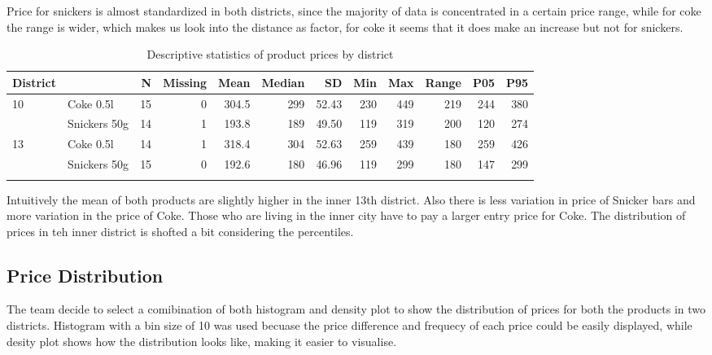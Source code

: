 \documentclass[
  9pt,
]{article}
\begin{document}
Price for snickers is almost standardized in both districts, since the
majority of data is concentrated in a certain price range, while for
coke the range is wider, which makes us look into the distance as
factor, for coke it seems that it does make an increase but not for
snickers.

\begin{table}[!h]

\caption{\label{tab:unnamed-chunk-3}Descriptive statistics of product prices by district}
\centering
\fontsize{8}{10}\selectfont
\begin{tabular}[t]{llrrrrrrrrrr}
\toprule
District &   & N & Missing & Mean & Median & SD & Min & Max & Range & P05 & P95\\
\midrule
10 & Coke 0.5l & 15 & \num{0} & \num{304.5} & \num{299} & \num{52.43} & 230 & 449 & \num{219} & \num{244} & \num{380}\\
 & Snickers 50g & 14 & \num{1} & \num{193.8} & \num{189} & \num{49.50} & 119 & 319 & \num{200} & \num{120} & \num{274}\\
13 & Coke 0.5l & 14 & \num{1} & \num{318.4} & \num{304} & \num{52.63} & 259 & 439 & \num{180} & \num{259} & \num{426}\\
 & Snickers 50g & 15 & \num{0} & \num{192.6} & \num{180} & \num{46.96} & 119 & 299 & \num{180} & \num{147} & \num{299}\\
\bottomrule
\multicolumn{12}{l}{\rule{0pt}{1em}}\\
\end{tabular}
\end{table}

Intuitively the mean of both products are slightly higher in the inner
13th district. Also there is less variation in price of Snicker bars and
more variation in the price of Coke. Those who are living in the inner
city have to pay a larger entry price for Coke. The distribution of
prices in teh inner district is shofted a bit considering the
percentiles.

\hypertarget{price-distribution}{%
\subsection{Price Distribution}\label{price-distribution}}

The team decide to select a comibination of both histogram and density
plot to show the distribution of prices for both the products in two
districts. Histogram with a bin size of 10 was used becuase the price
difference and frequecy of each price could be easily displayed, while
desity plot shows how the distribution looks like, making it easier to
visualise.
\end{document}
